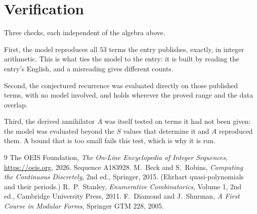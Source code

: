 \documentclass[11pt,a4paper]{article}
\theoremstyle{plain}
\theoremstyle{definition}
\begin{document}
\section{Verification}

Three checks, each independent of the algebra above.

First, the model reproduces all $53$ terms the entry publishes, exactly, in integer
arithmetic. This is what ties the model to the entry: it is built by reading the entry's
English, and a misreading gives different counts.

Second, the conjectured recurrence was evaluated directly on those published terms, with no
model involved, and holds wherever the proved range and the data overlap.

Third, the derived annihilator $A$ was itself tested on terms it had not been given: the model
was evaluated beyond the $S$ values that determine it and $A$ reproduced them. A bound that is
too small fails this test, which is why it is run.

\begin{thebibliography}{9}
 The OEIS Foundation, \emph{The On-Line Encyclopedia of Integer
Sequences}, \url{https://oeis.org}, 2026. Sequence A183928.
 M.~Beck and S.~Robins, \emph{Computing the Continuous Discretely},
2nd ed., Springer, 2015. (Ehrhart quasi-polynomials and their periods.)
 R.~P.~Stanley, \emph{Enumerative Combinatorics}, Volume 1, 2nd ed.,
Cambridge University Press, 2011.
 F.~Diamond and J.~Shurman, \emph{A First Course in Modular Forms},
Springer GTM 228, 2005.
\end{thebibliography}
\end{document}
